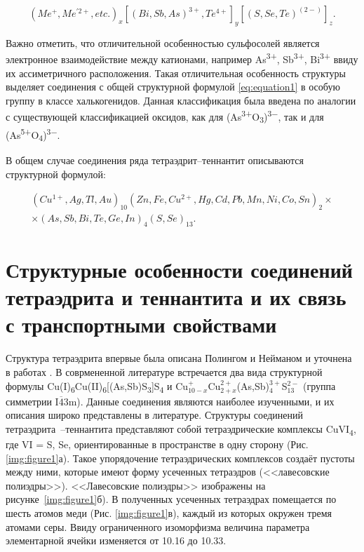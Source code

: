 \begin{equation}
  \label{eq:equation1}
  (Me^+,Me^{'2+},etc.)_{x}[(Bi, Sb,As)^{3+}, Te^{4+}]_{y}[(S,Se,Te)^{(2-)}]_{z}.
\end{equation}

Важно отметить, что отличительной особенностью сульфосолей является электронное взаимодействие между катионами, например As\textsuperscript{3+}, Sb\textsuperscript{3+}, Bi\textsuperscript{3+} ввиду их ассиметричного расположения. Такая отличительная особенность структуры выделяет соединения с общей структурной формулой  \eqref{eq:equation1} в особую группу в классе халькогенидов. Данная классификация была введена по аналогии с существующей классификацией оксидов, как для (As\textsuperscript{3+}O\textsubscript{3})\textsuperscript{3$-$}, так и для (As\textsuperscript{5+}O\textsubscript{4})\textsuperscript{3$-$}\cite{Nowacki1969}.

В общем случае соединения ряда тетраэдрит--теннантит описываются структурной формулой:

\begin{equation}
  \label{eq:equation2}
      \begin{multlined}
      (Cu^{1+},Ag,Tl,Au)_{10}(Zn,Fe,Cu^{2+},Hg,Cd,Pb,Mn,Ni,Co,Sn)_{2}\times \\
      \times(As,Sb,Bi,Te,Ge,In)_{4}(S,Se)_{13}.
      \end{multlined}
\end{equation}
\newpage


\section{Структурные особенности соединений тетраэдрита и теннантита  и их связь с транспортными свойствами} \label{sect1_1}

 Структура тетраэдрита впервые была описана Полингом и Нейманом  \cite{Pauling1934} и уточнена в работах \cite{Wuensch1963,Wuensch1964,Belov1969,Kaplunnik1980}.
 В соврмененной литературе встречается два вида структурной формулы Cu(I)\textsubscript{6}Cu(II)\textsubscript{6}[(As,Sb)S\textsubscript{3}]S\textsubscript{4}\cite{Johnson1986} и Cu$_{10-x}^{+}$Cu$_{2+x}^{2+}$(As,Sb)$_{4}^{3+}$S$_{13}^{2-}$ \cite{Friese2008,makovicky2005crystal,Foit2001} (группа симметрии I$\overline{\! 4}$3m).
Данные соединения являются наиболее изученными, и их описания широко представлены в литературе. Структуры соединений тетраэдрита~--теннантита представляют собой тетраэдрические комплексы  CuVI\textsubscript{4}, где VI = S, Se, ориентированные в пространстве в одну сторону (Рис. \ref{img:figure1}а). Такое упорядочение тетраэдрических комплексов создаёт пустоты между ними, которые имеют форму усеченных тетраэдров (<<лавесовские полиэдры>>). <<Лавесовские полиэдры>> изображены на рисунке~\ref{img:figure1}б). В полученных усеченных тетраэдрах помещается по шесть атомов меди (Рис. \ref{img:figure1}в), каждый из которых окружен тремя атомами серы\cite{Makovicky_2006}. Ввиду ограниченного изоморфизма величина параметра элементарной ячейки изменяется от 10.16 до 10.33.

